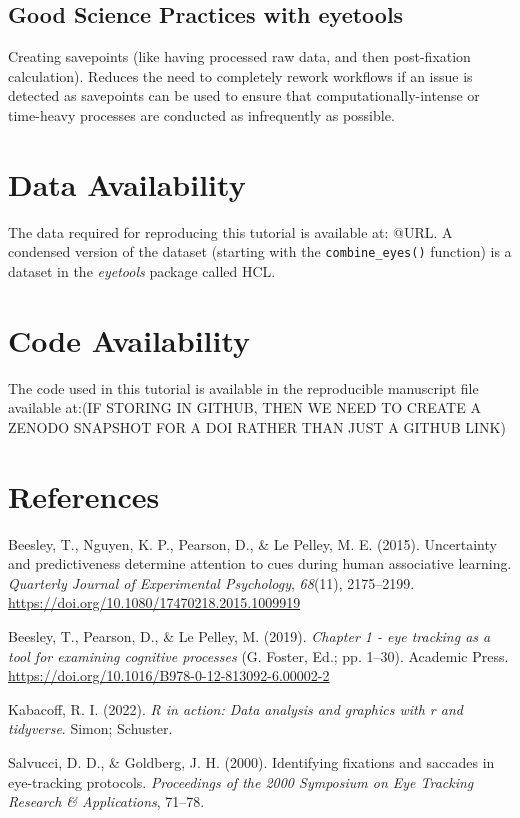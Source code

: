 \documentclass[
  man,
  floatsintext,
  longtable,
  nolmodern,
  notxfonts,
  notimes,
  colorlinks=true,linkcolor=blue,citecolor=blue,urlcolor=blue]{apa7}
\newlength{\cslhangindent}
\newenvironment{CSLReferences}[2] %
 {\begin{list}{}{%
  \setlength{\itemindent}{0pt}
  \setlength{\leftmargin}{0pt}
  \setlength{\parsep}{0pt}
  \ifodd #1
   \setlength{\leftmargin}{\cslhangindent}
   \setlength{\itemindent}{-1\cslhangindent}
  \fi
  \setlength{\itemsep}{#2\baselineskip}}}
 {\end{list}}
\begin{document}
\subsection{Good Science Practices with
eyetools}\label{good-science-practices-with-eyetools}

Creating savepoints (like having processed raw data, and then
post-fixation calculation). Reduces the need to completely rework
workflows if an issue is detected as savepoints can be used to ensure
that computationally-intense or time-heavy processes are conducted as
infrequently as possible.

\section{Data Availability}\label{data-availability}

The data required for reproducing this tutorial is available at: @URL. A
condensed version of the dataset (starting with the
\texttt{combine\_eyes()} function) is a dataset in the \emph{eyetools}
package called HCL.

\section{Code Availability}\label{code-availability}

The code used in this tutorial is available in the reproducible
manuscript file available at:(IF STORING IN GITHUB, THEN WE NEED TO
CREATE A ZENODO SNAPSHOT FOR A DOI RATHER THAN JUST A GITHUB LINK)

\section{References}\label{references}

\label{refs}
\begin{CSLReferences}{1}{0}
Beesley, T., Nguyen, K. P., Pearson, D., \& Le Pelley, M. E. (2015).
Uncertainty and predictiveness determine attention to cues during human
associative learning. \emph{Quarterly Journal of Experimental
Psychology}, \emph{68}(11), 2175--2199.
\url{https://doi.org/10.1080/17470218.2015.1009919}

Beesley, T., Pearson, D., \& Le Pelley, M. (2019). \emph{Chapter 1 - eye
tracking as a tool for examining cognitive processes} (G. Foster, Ed.;
pp. 1--30). Academic Press.
\url{https://doi.org/10.1016/B978-0-12-813092-6.00002-2}

Kabacoff, R. I. (2022). \emph{R in action: Data analysis and graphics
with r and tidyverse}. Simon; Schuster.

Salvucci, D. D., \& Goldberg, J. H. (2000). Identifying fixations and
saccades in eye-tracking protocols. \emph{Proceedings of the 2000
Symposium on Eye Tracking Research \& Applications}, 71--78.

\end{CSLReferences}
\end{document}
